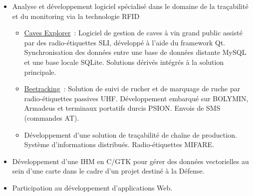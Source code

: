 \documentclass[12pt,a4paper,sans]{moderncv}
\begin{document}
{\begin{itemize}
\begin{itemize}
		      	      cartes)
		      	\item Décodage/encodage de pistes magnétiques
		      	\item Programmation par interruptions
		      	\item Protocole de communication série (basé sur HDLC)
		      	\item Recettes de construction automatique de fichiers CMake
		      	\item Intégration Continue via Jenkins
		      	\item Tests fonctionnels semi-automatiques
		      \end{itemize}
		\item Analyse et développement logiciel spécialisé dans le domaine
		      de la traçabilité et du monitoring via la technologie RFID
		      \begin{itemize}
		      	\item \href{http://www.caves-explorer.com/}{Caves Explorer}~:
		      	      Logiciel de gestion de caves à vin grand public assisté
		      	      par des radio-étiquettes SLI, développé à l'aide du
		      	      framework Qt.
		      	      Synchronisation des données entre une base de données
		      	      distante MySQL et une base locale SQLite.
		      	      Solutions dérivés intégrés à la solution principale.
		      	\item \href{http://www.beetracking.com/}{Beetracking}~:
		      	      Solution de suivi de rucher et de marquage de ruche par
		      	      radio-étiquettes passives {UHF}.
		      	      Développement embarqué sur BOLYMIN, Armadeus et terminaux
		      	      portatifs durcis {PSION}.
		      	      Envois de SMS (commandes AT).
		      	\item
		      	      Développement d'une solution de traçabilité de chaîne de
		      	      production.
		      	      Système d'informations distribués.
		      	      Radio-étiquettes {MIFARE}.
		      \end{itemize}
		\item Développement d'une IHM en C/GTK pour gérer des données
		      vectorielles au sein d'une carte dans le cadre d'un projet destiné
		      à la Défense.
		\item Participation au développement d'applications Web.
	\end{itemize}}

\end{document}
